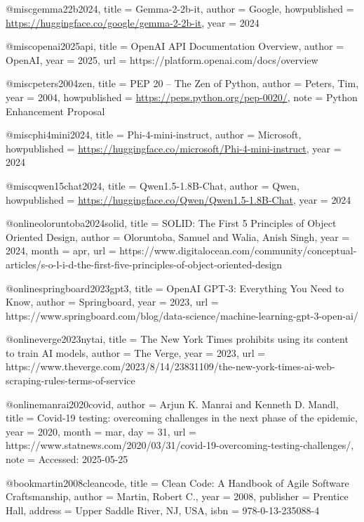 \documentclass[12pt]{report}
\theoremstyle{definition}
\begin{document}
@misc{gemma22b2024,
  title = {Gemma-2-2b-it},
  author = {Google},
  howpublished = {\url{https://huggingface.co/google/gemma-2-2b-it}},
  year = {2024}
}

@misc{openai2025api,
  title = {{OpenAI} {API} Documentation Overview},
  author = {OpenAI},
  year = {2025},
  url = {https://platform.openai.com/docs/overview}
}

@misc{peters2004zen,
  title = {{PEP} 20 -- The Zen of Python},
  author = {Peters, Tim},
  year = {2004},
  howpublished = {\url{https://peps.python.org/pep-0020/}},
  note = {Python Enhancement Proposal}
}

@misc{phi4mini2024,
  title = {Phi-4-mini-instruct},
  author = {Microsoft},
  howpublished = {\url{https://huggingface.co/microsoft/Phi-4-mini-instruct}},
  year = {2024}
}

@misc{qwen15chat2024,
  title = {Qwen1.5-1.8B-Chat},
  author = {Qwen},
  howpublished = {\url{https://huggingface.co/Qwen/Qwen1.5-1.8B-Chat}},
  year = {2024}
}

@online{oloruntoba2024solid,
  title = {{SOLID}: The First 5 Principles of Object Oriented Design},
  author = {Oloruntoba, Samuel and Walia, Anish Singh},
  year = {2024},
  month = apr,
  url = {https://www.digitalocean.com/community/conceptual-articles/s-o-l-i-d-the-first-five-principles-of-object-oriented-design}
}

@online{springboard2023gpt3,
  title = {{OpenAI} {GPT-3}: Everything You Need to Know},
  author = {Springboard},
  year = {2023},
  url = {https://www.springboard.com/blog/data-science/machine-learning-gpt-3-open-ai/}
}

@online{verge2023nytai,
  title = {The New York Times prohibits using its content to train {AI} models},
  author = {The Verge},
  year = {2023},
  url = {https://www.theverge.com/2023/8/14/23831109/the-new-york-times-ai-web-scraping-rules-terms-of-service}
}

@online{manrai2020covid,
  author       = {Arjun K. Manrai and Kenneth D. Mandl},
  title        = {Covid-19 testing: overcoming challenges in the next phase of the epidemic},
  year         = {2020},
  month        = mar,
  day          = {31},
  url          = {https://www.statnews.com/2020/03/31/covid-19-overcoming-testing-challenges/},
  note         = {Accessed: 2025-05-25}
}

@book{martin2008cleancode,
  title        = {Clean Code: A Handbook of Agile Software Craftsmanship},
  author       = {Martin, Robert C.},
  year         = {2008},
  publisher    = {Prentice Hall},
  address      = {Upper Saddle River, NJ, USA},
  isbn         = {978-0-13-235088-4}
}
\end{document}
